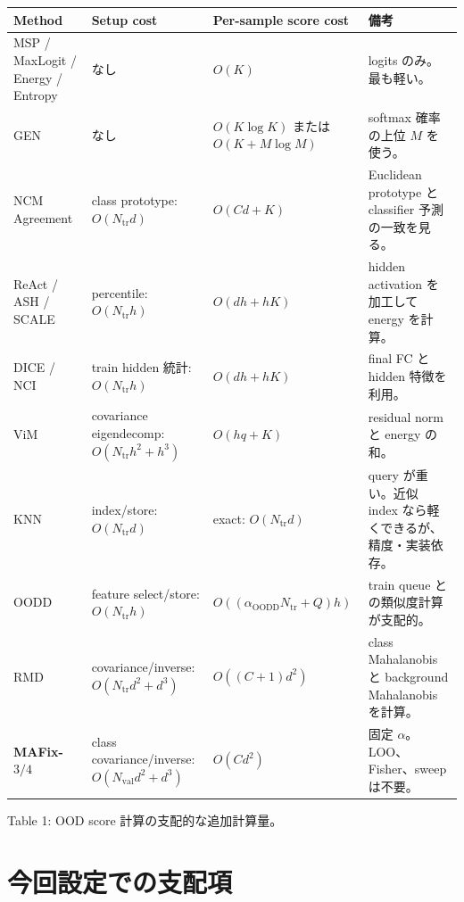 \documentclass[a4paper,11pt]{ltjsarticle}
\begin{document}
\begin{center}
\scriptsize
\setlength{\tabcolsep}{3pt}
\begin{tabular}{p{25mm}p{35mm}p{42mm}p{37mm}}
\toprule
Method & Setup cost & Per-sample score cost & 備考\\
\midrule
MSP / MaxLogit / Energy / Entropy
& なし
& $O(K)$
& logits のみ。最も軽い。\\
\midrule
GEN
& なし
& $O(K\log K)$ または $O(K+M\log M)$
& softmax 確率の上位 $M$ を使う。\\
\midrule
NCM Agreement
& class prototype: $O(N_{\mathrm{tr}}d)$
& $O(Cd+K)$
& Euclidean prototype と classifier 予測の一致を見る。\\
\midrule
ReAct / ASH / SCALE
& percentile: $O(N_{\mathrm{tr}}h)$
& $O(dh+hK)$
& hidden activation を加工して energy を計算。\\
\midrule
DICE / NCI
& train hidden 統計: $O(N_{\mathrm{tr}}h)$
& $O(dh+hK)$
& final FC と hidden 特徴を利用。\\
\midrule
ViM
& covariance eigendecomp:
$O(N_{\mathrm{tr}}h^2+h^3)$
& $O(hq+K)$
& residual norm と energy の和。\\
\midrule
KNN
& index/store: $O(N_{\mathrm{tr}}d)$
& exact: $O(N_{\mathrm{tr}}d)$
& query が重い。近似 index なら軽くできるが、精度・実装依存。\\
\midrule
OODD
& feature select/store:
$O(N_{\mathrm{tr}}h)$
& $O((\alpha_{\mathrm{OODD}}N_{\mathrm{tr}}+Q)h)$
& train queue との類似度計算が支配的。\\
\midrule
RMD
& covariance/inverse:
$O(N_{\mathrm{tr}}d^2+d^3)$
& $O((C+1)d^2)$
& class Mahalanobis と background Mahalanobis を計算。\\
\midrule
\textbf{MAFix-$3/4$}
& class covariance/inverse:
$O(N_{\mathrm{val}}d^2+d^3)$
& \textbf{$O(Cd^2)$}
& 固定 $\alpha$。LOO、Fisher、sweep は不要。\\
\bottomrule
\end{tabular}
\end{center}

\begin{center}
Table 1: OOD score 計算の支配的な追加計算量。
\label{tab:complexity}
\end{center}

\section{今回設定での支配項}
\end{document}
